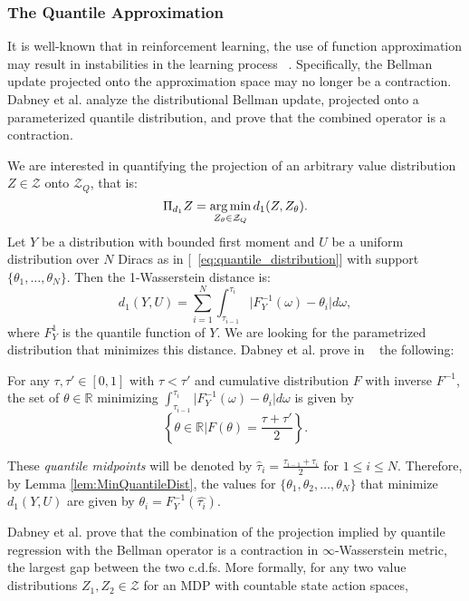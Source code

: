 \subsubsection{The Quantile Approximation}
It is well-known that in reinforcement learning, the use of function approximation may result in instabilities in the learning process ~\cite{Tsitsiklis97ananalysis}. Specifically, the Bellman update projected onto the approximation space may no longer be a contraction. Dabney et al. analyze the distributional Bellman update, projected onto a parameterized quantile distribution, and prove that the combined operator is a contraction. \par
We are interested in quantifying the projection of an arbitrary value distribution $Z \in \mathcal{Z}$ onto $\mathcal{Z}_Q$, that is:
\begin{equation}
	\Pi_{d_1}Z= \operatorname*{arg\,min}_{Z_\theta \in \mathcal{Z}_Q} d_1(Z,Z_\theta).
\end{equation}
Let $Y$ be a distribution with bounded first moment and $U$ be a uniform distribution over $N$ Diracs as in [~\ref{eq:quantile_distribution}] with support $\lbrace \theta_1, \ldots, \theta_N \rbrace$. Then the 1-Wasserstein distance is:
\begin{equation}
	d_1(Y,U)= \sum_{i=1}^{N} \int_{\tau_{i-1}}^{\tau_i} \vert F_Y^{-1}(\omega)- \theta_i \vert d \omega,
\end{equation}
where $F_Y^{1}$ is the quantile function of $Y$. We are looking for the parametrized distribution that minimizes this distance. Dabney et al. prove in ~\cite{DBLP:journals/corr/abs-1710-10044} the following: 
\begin{lemma}
	For any $\tau, \tau' \in [0,1]$ with $\tau < \tau'$ and cumulative distribution $F$ with inverse $F^{-1}$, the set of $\theta \in \mathbb{R}$ minimizing $\int_{\tau_{i-1}}^{\tau_i} \vert F_Y^{-1}(\omega)- \theta_i \vert d \omega$ is given by 
	\begin{equation*}
		\left\lbrace \theta \in \mathbb{R} \vert F(\theta)=\frac{\tau+\tau'}{2} \right\rbrace.
	\end{equation*}
	\label{lem:MinQuantileDist}
\end{lemma}
These \emph{quantile midpoints} will be denoted by $\hat{\tau}_i=\frac{\tau_{i-1}+\tau_i}{2}$ for $1 \leq i \leq N$. Therefore, by Lemma \ref{lem:MinQuantileDist}, the values for $\lbrace \theta_1,\theta_2,\ldots,\theta_N\rbrace$ that minimize $d_1(Y,U)$ are given by $\theta_i=F^{-1}_Y(\hat{\tau_i})$.\par
Dabney et al. prove that the combination of the projection implied by quantile regression with the Bellman operator is a contraction in $\infty$-Wasserstein metric, \ie the largest gap between the two c.d.fs. More formally, for any two value distributions $Z_1, Z_2 \in \mathcal{Z}$ for an MDP with countable state action spaces, 
